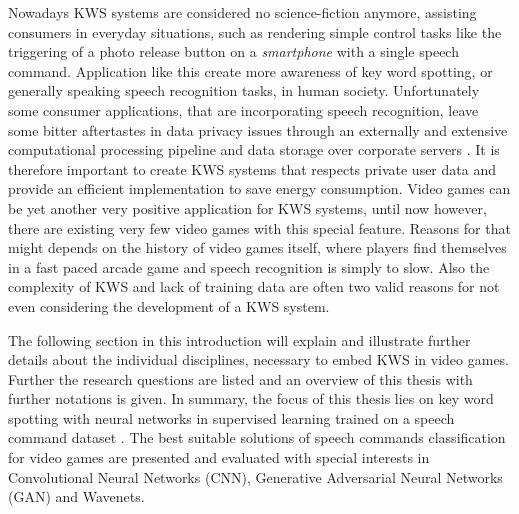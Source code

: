 Nowadays KWS systems are considered no science-fiction anymore, assisting consumers in everyday situations, such as rendering simple control tasks like the triggering of a photo release button on a \emph{smartphone} with a single speech command.
Application like this create more awareness of key word spotting, or generally speaking speech recognition tasks, in human society.
Unfortunately some consumer applications, that are incorporating speech recognition, leave some bitter aftertastes in data privacy issues through an externally and extensive computational processing pipeline and data storage over corporate servers \cite{Tang2018}.
It is therefore important to create KWS systems that respects private user data and provide an efficient implementation to save energy consumption. %
Video games can be yet another very positive application for KWS systems, until now however, there are existing very few video games with this special feature.
Reasons for that might depends on the history of video games itself, where players find themselves in a fast paced arcade game and speech recognition is simply to slow.
Also the complexity of KWS and lack of training data are often two valid reasons for not even considering the development of a KWS system.

The following section in this introduction will explain and illustrate further details about the individual disciplines, necessary to embed KWS in video games. 
Further the research questions are listed and an overview of this thesis with further notations is given.
In summary, the focus of this thesis lies on key word spotting with neural networks in supervised learning trained on a speech command dataset \cite{Warden2018}.
The best suitable solutions of speech commands classification for video games are presented and evaluated with special interests in Convolutional Neural Networks (CNN), Generative Adversarial Neural Networks (GAN) and Wavenets.






%
%
%





